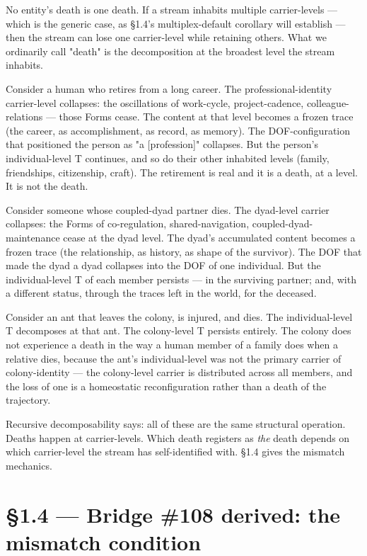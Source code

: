 \documentclass[11pt, openany]{book}
\newcommand{\sectionbreak}{\clearpage}
\begin{document}
No entity's death is one death. If a stream inhabits multiple carrier-levels --- which is the generic case, as §1.4's multiplex-default corollary will establish --- then the stream can lose one carrier-level while retaining others. What we ordinarily call "death" is the decomposition at the broadest level the stream inhabits.

Consider a human who retires from a long career. The professional-identity carrier-level collapses: the oscillations of work-cycle, project-cadence, colleague-relations --- those Forms cease. The content at that level becomes a frozen trace (the career, as accomplishment, as record, as memory). The DOF-configuration that positioned the person as "a [profession]" collapses. But the person's individual-level T continues, and so do their other inhabited levels (family, friendships, citizenship, craft). The retirement is real and it is a death, at a level. It is not the death.

Consider someone whose coupled-dyad partner dies. The dyad-level carrier collapses: the Forms of co-regulation, shared-navigation, coupled-dyad-maintenance cease at the dyad level. The dyad's accumulated content becomes a frozen trace (the relationship, as history, as shape of the survivor). The DOF that made the dyad a dyad collapses into the DOF of one individual. But the individual-level T of each member persists --- in the surviving partner; and, with a different status, through the traces left in the world, for the deceased.

Consider an ant that leaves the colony, is injured, and dies. The individual-level T decomposes at that ant. The colony-level T persists entirely. The colony does not experience a death in the way a human member of a family does when a relative dies, because the ant's individual-level was not the primary carrier of colony-identity --- the colony-level carrier is distributed across all members, and the loss of one is a homeostatic reconfiguration rather than a death of the trajectory.

Recursive decomposability says: all of these are the same structural operation. Deaths happen at carrier-levels. Which death registers as \textit{the} death depends on which carrier-level the stream has self-identified with. §1.4 gives the mismatch mechanics.

\sectionbreak

\section{§1.4 --- Bridge \#108 derived: the mismatch condition}
\end{document}

